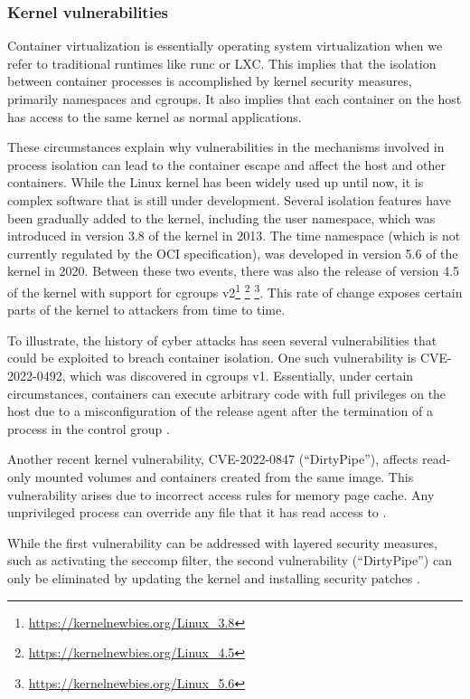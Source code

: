 \subsubsection{Kernel vulnerabilities}

Container virtualization is essentially operating system virtualization when we refer to traditional runtimes like runc or LXC. This implies that the isolation between container processes is accomplished by kernel security measures, primarily namespaces and cgroups. It also implies that each container on the host has access to the same kernel as normal applications. 

These circumstances explain why vulnerabilities in the mechanisms involved in process isolation can lead to the container escape and affect the host and other containers. While the Linux kernel has been widely used up until now, it is complex software that is still under development. Several isolation features have been gradually added to the kernel, including the user namespace, which was introduced in version 3.8 of the kernel in 2013. The time namespace (which is not currently regulated by the OCI specification), was developed in version 5.6 of the kernel in 2020. Between these two events, there was also the release of version 4.5 of the kernel with support for cgroups v2\footnote{\url{https://kernelnewbies.org/Linux_3.8}} \footnote{\url{https://kernelnewbies.org/Linux_4.5}} \footnote{\url{https://kernelnewbies.org/Linux_5.6}}. This rate of change exposes certain parts of the kernel to attackers from time to time.

To illustrate, the history of cyber attacks has seen several vulnerabilities that could be exploited to breach container isolation. One such vulnerability is CVE-2022-0492, which was discovered in cgroups v1. Essentially, under certain circumstances, containers can execute arbitrary code with full privileges on the host due to a misconfiguration of the release agent after the termination of a process in the control group \cite{s:CVE-2022-0492}.

Another recent kernel vulnerability, CVE-2022-0847 (``DirtyPipe''), affects read-only mounted volumes and containers created from the same image. This vulnerability arises due to incorrect access rules for memory page cache. Any unprivileged process can override any file that it has read access to \cite{aqua:dirtypipe}.

While the first vulnerability can be addressed with layered security measures, such as activating the seccomp filter, the second vulnerability (``DirtyPipe'') can only be eliminated by updating the kernel and installing security patches \cite{aqua:dirtypipe1}.

